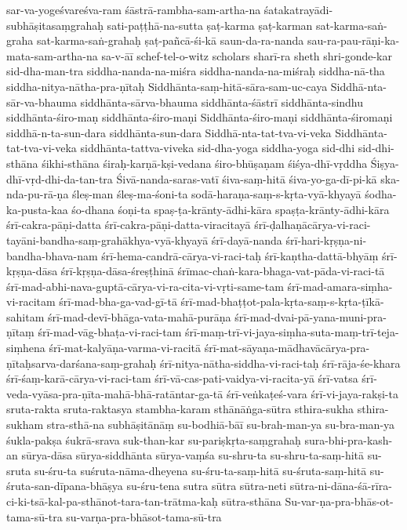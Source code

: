 {sar-va-yogeśvareśva-ram
śāstrā-rambha-sam-artha-na
śatakatrayādi-subhāṣitasaṃgrahaḥ
sati-paṭṭhā-na-sutta
ṣaṭ-karma
ṣaṭ-karman
sat-karma-saṅ-graha
sat-karma-saṅ-grahaḥ
ṣaṭ-pañcā-śi-kā
saun-da-ra-nanda
sau-ra-pau-rāṇi-ka-mata-sam-artha-na
sa-v-āī
schef-tel-o-witz
scholars
sharī-ra
sheth
shri-gonde-kar
sid-dha-man-tra
siddha-nanda-na-miśra
siddha-nanda-na-miśraḥ
siddha-nā-tha
siddha-nitya-nātha-pra-ṇītaḥ
Siddhānta-saṃ-hitā-sāra-sam-uc-caya
Siddhā-nta-sār-va-bhauma
siddhānta-sārva-bhauma
siddhānta-śāstrī
siddhānta-sindhu
siddhānta-śiro-maṇ
siddhānta-śiro-maṇi
Siddhānta-śiro-maṇi
siddhānta-śiromaṇi
siddhā-n-ta-sun-dara
siddhānta-sun-dara
Siddhā-nta-tat-tva-vi-veka
Siddhānta-tat-tva-vi-veka
siddhānta-tattva-viveka
sid-dha-yoga
siddha-yoga
sid-dhi
sid-dhi-sthāna
śikhi-sthāna
śiraḥ-karṇā-kṣi-vedana
śiro-bhūṣaṇam
śiśya-dhī-vṛddha
Śiṣya-dhī-vṛd-dhi-da-tan-tra
Śivā-nanda-saras-vatī
śiva-saṃ-hitā
śiva-yo-ga-dī-pi-kā
ska-nda-pu-rā-ṇa
śleṣ-man
śleṣ-ma-śoni-ta
sodā-haraṇa-saṃ-s-kṛta-vyā-khyayā
śodha-ka-pusta-kaa
śo-dhana
śoṇi-ta
spaṣ-ṭa-krānty-ādhi-kāra
spaṣṭa-krānty-ādhi-kāra
śrī-cakra-pāṇi-datta
śrī-cakra-pāṇi-datta-viracitayā
śrī-ḍalhaṇācārya-vi-raci-tayāni-bandha-saṃ-grahākhya-vyā-khyayā
śrī-dayā-nanda
śrī-hari-kṛṣṇa-ni-bandha-bhava-nam
śrī-hema-candrā-cārya-vi-raci-taḥ
śrī-kaṇtha-dattā-bhyāṃ
śrī-kṛṣṇa-dāsa
śrī-kṛṣṇa-dāsa-śreṣṭhinā
śrīmac-chaṅ-kara-bhaga-vat-pāda-vi-raci-tā
śrī-mad-abhi-nava-guptā-cārya-vi-ra-cita-vi-vṛti-same-tam
śrī-mad-amara-siṃha-vi-racitam
śrī-mad-bha-ga-vad-gī-tā
śrī-mad-bhaṭṭot-pala-kṛta-saṃ-s-kṛta-ṭīkā-sahitam
śrī-mad-devī-bhāga-vata-mahā-purāṇa
śrī-mad-dvai-pā-yana-muni-pra-ṇītaṃ
śrī-mad-vāg-bhaṭa-vi-raci-tam
śrī-maṃ-trī-vi-jaya-siṃha-suta-maṃ-trī-teja-siṃhena
śrī-mat-kalyāṇa-varma-vi-racitā
śrī-mat-sāyaṇa-mādhavācārya-pra-ṇītaḥsarva-darśana-saṃ-grahaḥ
śrī-nitya-nātha-siddha-vi-raci-taḥ
śrī-rāja-śe-khara
śrī-śaṃ-karā-cārya-vi-raci-tam
śrī-vā-cas-pati-vaidya-vi-racita-yā
śrī-vatsa
śrī-veda-vyāsa-pra-ṇīta-mahā-bhā-ratāntar-ga-tā
śrī-veṅkaṭeś-vara
śrī-vi-jaya-rakṣi-ta
sruta-rakta
sruta-raktasya
stambha-karam
sthānāṅga-sūtra
sthira-sukha
sthira-sukham
stra-sthā-na
subhāṣitānāṃ
su-bodhiā-bāī
su-brah-man-ya
su-bra-man-ya
śukla-pakṣa
śukrā-srava
suk-than-kar
su-pariṣkṛta-saṃgrahaḥ
sura-bhi-pra-kash-an
sūrya-dāsa
sūrya-siddhānta
sūrya-vaṃśa
su-shru-ta
su-shru-ta-saṃ-hitā
su-sruta
su-śru-ta
suśruta-nāma-dheyena
su-śru-ta-saṃ-hitā
su-śruta-saṃ-hitā
su-śruta-san-dīpana-bhāṣya
su-śru-tena
sutra
sūtra
sūtra-neti
sūtra-ni-dāna-śā-rīra-ci-ki-tsā-kal-pa-sthānot-tara-tan-trātma-kaḥ
sūtra-sthāna
Su-var-ṇa-pra-bhās-ot-tama-sū-tra
su-varṇa-pra-bhāsot-tama-sū-tra
}
